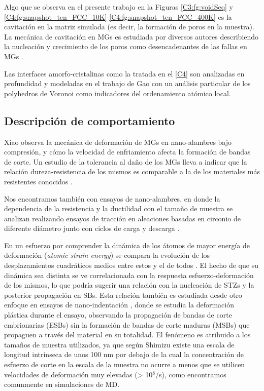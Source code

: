 Algo que se observa en el presente trabajo en la Figuras \ref{C3:fg:voidSeq} y \ref{C4:fg:snapshot_ten_FCC_10K}-\ref{C4:fg:snapshot_ten_FCC_400K} es la cavitación en la matriz simulada (es decir, la formación de poros en la muestra). La mecánica de cavitación en MGs es estudiada por diversos autores describiendo la nucleación y crecimiento de los poros como desencadenantes de las fallas en MGs \citep{Huang13, guan13}.

Las interfaces amorfo-cristalinas como la tratada en el \cref{C4} son analizadas en profundidad y modeladas en el trabajo de Gao \citep{Gao14} con un análisis particular de los polyhedros de Voronoi como indicadores del ordenamiento atómico local.

\subsection{Descripción de comportamiento}
\label{S1_2_2}

Xiao \citep{xiao12} observa la mecánica de deformación de MGs en nano-alambres bajo compresión, y cómo la velocidad de enfriamiento afecta la formación de bandas de corte. Un estudio de la tolerancia al daño de los MGs lleva a indicar que la relación dureza-resistencia de los mismos es comparable a la de los materiales más resistentes conocidos \citep{Demetriou11}.

Nos encontramos también con ensayos de nano-alambres, en donde la dependencia de la resistencia y la ductilidad con el tamaño de muestra se analizan realizando ensayos de tracción en aleaciones basadas en circonio de diferente diámetro junto con ciclos de carga y descarga \citep{Dongchan10}.

En un esfuerzo por comprender la dinámica de los átomos de mayor energía de deformación (\textit{atomic strain energy}) se compara la evolución de los desplazamientos cuadráticos medios entre estos y el de todos \citep{tang15}. El hecho de que su dinámica sea distinta se ve correlacionada con la respuesta esfuerzo-deformación de los mismos, lo que podría sugerir una relación con la nucleación de STZs y la posterior propagación en SBs. Esta relación también es estudiada desde otro enfoque en ensayos de nano-indentación \citep{gu15}, donde se estudia la deformación plástica durante el ensayo, observando la propagación de bandas de corte embrionarias (ESBs) sin la formación de bandas de corte maduras (MSBs) que propaguen a través del material en su totalidad. El fenómeno es atribuido a los tamaños de muestra utilizados, ya que según Shimizu \citep{shimizu06} existe una escala de longitud intrínseca de unos 100 nm por debajo de la cual la concentración de esfuerzo de corte en la escala de la muestra no ocurre a menos que se utilicen velocidades de deformación muy elevadas (> 10$^{8}$/s), como encontramos comunmente en simulaciones de MD.

